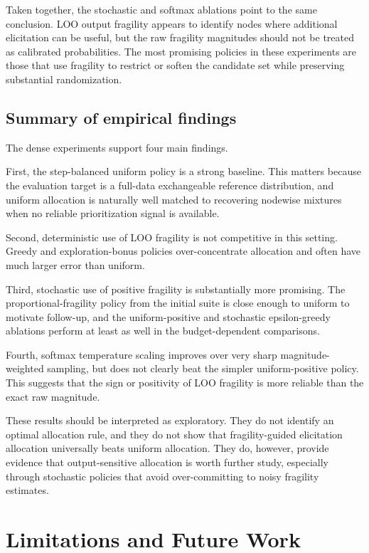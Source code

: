 \documentclass[11pt]{article}
\begin{document}
Taken together, the stochastic and softmax ablations point to the same conclusion. LOO output fragility appears to identify nodes where additional elicitation can be useful, but the raw fragility magnitudes should not be treated as calibrated probabilities. The most promising policies in these experiments are those that use fragility to restrict or soften the candidate set while preserving substantial randomization.

\subsection{Summary of empirical findings}

The dense experiments support four main findings.

First, the step-balanced uniform policy is a strong baseline. This matters because the evaluation target is a full-data exchangeable reference distribution, and uniform allocation is naturally well matched to recovering nodewise mixtures when no reliable prioritization signal is available.

Second, deterministic use of LOO fragility is not competitive in this setting. Greedy and exploration-bonus policies over-concentrate allocation and often have much larger error than uniform.

Third, stochastic use of positive fragility is substantially more promising. The proportional-fragility policy from the initial suite is close enough to uniform to motivate follow-up, and the uniform-positive and stochastic epsilon-greedy ablations perform at least as well in the budget-dependent comparisons.

Fourth, softmax temperature scaling improves over very sharp magnitude-weighted sampling, but does not clearly beat the simpler uniform-positive policy. This suggests that the sign or positivity of LOO fragility is more reliable than the exact raw magnitude.

These results should be interpreted as exploratory. They do not identify an optimal allocation rule, and they do not show that fragility-guided elicitation allocation universally beats uniform allocation. They do, however, provide evidence that output-sensitive allocation is worth further study, especially through stochastic policies that avoid over-committing to noisy fragility estimates.

\section{Limitations and Future Work}
\end{document}
